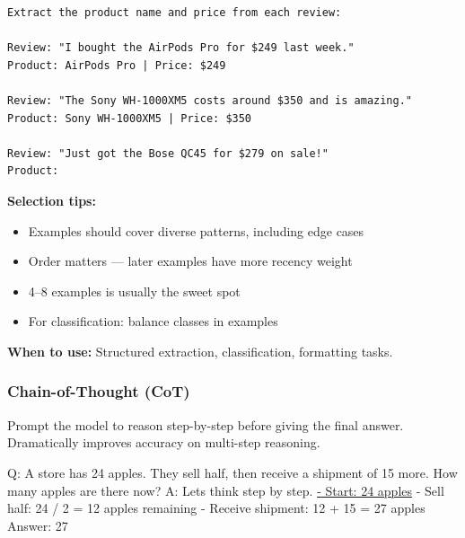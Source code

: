 \documentclass[11pt]{article}
\providecommand{\tightlist}{\setlength{\itemsep}{1pt}\setlength{\parskip}{0pt}}
\newenvironment{Shaded}{\begin{snugshade}}{\end{snugshade}}
\newcommand{\DecValTok}[1]{\textcolor[rgb]{0.96,0.45,0.00}{#1}}
\newcommand{\ErrorTok}[1]{\textcolor[rgb]{0.85,0.27,0.33}{\underline{#1}}}
\newcommand{\NormalTok}[1]{\textcolor[rgb]{0.81,0.81,0.76}{#1}}
\newcommand{\OperatorTok}[1]{\textcolor[rgb]{0.81,0.81,0.76}{#1}}
\newcommand{\StringTok}[1]{\textcolor[rgb]{0.96,0.31,0.31}{#1}}
\begin{document}
\begin{verbatim}
Extract the product name and price from each review:

Review: "I bought the AirPods Pro for $249 last week."
Product: AirPods Pro | Price: $249

Review: "The Sony WH-1000XM5 costs around $350 and is amazing."
Product: Sony WH-1000XM5 | Price: $350

Review: "Just got the Bose QC45 for $279 on sale!"
Product:
\end{verbatim}

\textbf{Selection tips:}

\begin{itemize}
\tightlist
\item
  Examples should cover diverse patterns, including edge cases
\item
  Order matters --- later examples have more recency weight
\item
  4--8 examples is usually the sweet spot
\item
  For classification: balance classes in examples
\end{itemize}

\textbf{When to use:} Structured extraction, classification, formatting tasks.

\subsubsection{Chain-of-Thought (CoT)}\label{chain-of-thought-cot}

Prompt the model to reason step-by-step before giving the final answer. Dramatically improves accuracy on multi-step reasoning.


\begin{Shaded}
\begin{Highlighting}[]
\NormalTok{Q: A store has }\DecValTok{24}\NormalTok{ apples. They sell half, then receive a shipment of }\DecValTok{15}\NormalTok{ more.}
\NormalTok{   How many apples are there now?}
\NormalTok{A: Let}\StringTok{\textquotesingle{}s think step by step.}
\ErrorTok{   {-} Start: 24 apples}
   \OperatorTok{{-}}\NormalTok{ Sell half: }\DecValTok{24} \OperatorTok{/} \DecValTok{2} \OperatorTok{=} \DecValTok{12}\NormalTok{ apples remaining}
   \OperatorTok{{-}}\NormalTok{ Receive shipment: }\DecValTok{12} \OperatorTok{+} \DecValTok{15} \OperatorTok{=} \DecValTok{27}\NormalTok{ apples}
\NormalTok{   Answer: }\DecValTok{27}
\end{Highlighting}
\end{Shaded}
\end{document}
